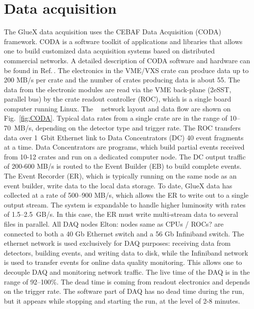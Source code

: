 
\section[Data Acquisition]{Data acquisition \label{sec:daq}}



The GlueX data acquisition uses the CEBAF Data Acquisition (CODA) framework. CODA is a software toolkit of applications and libraries that allows one to build customized data acquisition systems based on distributed commercial networks. A detailed description of CODA software and hardware can be found in Ref.\,\cite{CLAS12_DAQ}. 
The electronics in the VME/VXS crate can produce data up to 200 MB/s per crate and the
number of crates producing data is about 55.
The data from the electronic modules are read via the VME back-plane (2eSST, parallel bus) by the crate readout controller (ROC), which is a single board computer running Linux.
The \gx~ network layout and data flow are shown on Fig.~\ref{fig:CODA}.
Typical data rates from a single crate are in the range of 10--70~MB/s, depending on the detector type and trigger rate.
The ROC transfers data over 1~Gbit Ethernet link to Data Concentrators (DC) 40 event fragments at a time. Data Concentrators are programs, which build partial events received from 10-12 crates and run on a dedicated computer node.
The DC output traffic of 200-600 MB/s is routed to the Event Builder (EB) to build complete events.
The Event Recorder (ER), which is typically running on the same node as an event builder, write data to the local data storage.
To date, GlueX data has collected at a rate of 500--900 MB/s, which allows the ER to write out to a single output stream. The system is expandable to handle higher luminosity with rates of 1.5--2.5~GB/s. In this case, the ER must write multi-stream data to several files in parallel.
All DAQ nodes {\color{red} Elton: nodes same as CPUs / ROCs? } are connected to both a 40 Gb Ethernet switch and a 56 Gb Infiniband switch.
The ethernet network is used exclusively for DAQ purposes: receiving data from detectors, building events, and writing data to disk, 
while the Infiniband network is used to transfer events for online data quality monitoring. 
This allows one to decouple DAQ and monitoring network traffic.
The live time of the DAQ is in the range of 92--100\%. The dead time is coming from readout electronics and depends on the trigger rate.  
The software part of DAQ has no dead time during the run, but it appears while stopping and starting the run, at the level of 2-8 minutes. 



